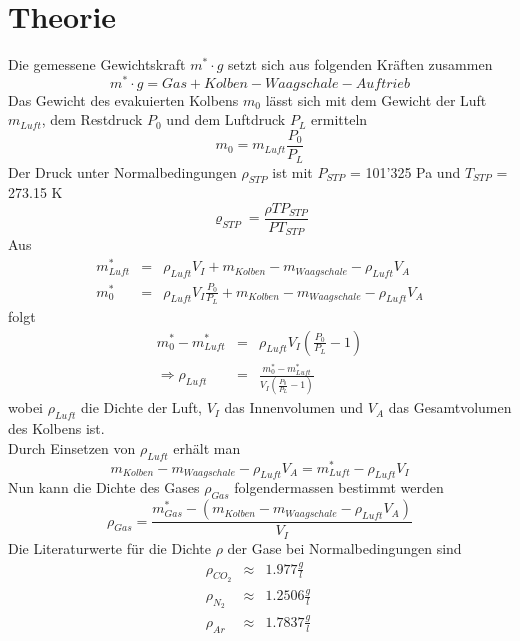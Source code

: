 \documentclass[12pt,a4paper]{article}
\begin{document}
\section*{Theorie}
Die gemessene Gewichtskraft $m^* \cdot g$ setzt sich aus folgenden Kr\"aften zusammen 
\begin{equation}
m^* \cdot g = Gas + Kolben - Waagschale - Auftrieb
\end{equation}
Das Gewicht des evakuierten Kolbens $m_0$ l\"asst sich mit dem Gewicht der Luft $m_{Luft}$, dem Restdruck $P_0$ und dem Luftdruck $P_L$ ermitteln
\begin{equation}
m_0 = m_{Luft} \frac{P_0}{P_L}
\end{equation}
Der Druck unter Normalbedingungen $\rho_{STP}$ ist mit $P_{STP}$ = 101'325 Pa und $T_{STP}$ = 273.15 K
\begin{equation}\label{eq:stp}
\varrho_{STP} = \frac{\rho T P_{STP}}{P T_{STP}}
\end{equation}
Aus
\begin{eqnarray}
m^*_{Luft} & = & \rho _{Luft} V_I + m_{Kolben} - m_{Waagschale} - \rho_{Luft} V_A \\
m^*_0 & = & \rho_{Luft} V_I \frac{P_0}{P_L} + m_{Kolben} - m_{Waagschale} - \rho_{Luft} V_A 
\end{eqnarray}
folgt
\begin{eqnarray}
m^*_0 - m^*_{Luft} & = & \rho_{Luft}V_I \left( \frac{P_0}{P_L}-1\right) \\
\Rightarrow \rho_{Luft} & = & \frac{m^*_0 - m^*_{Luft}}{V_I \left( \frac{P_0}{P_L}-1\right)}  \label{eq:rl}
\end{eqnarray}
wobei $\rho_{Luft}$ die Dichte der Luft, $V_I$ das Innenvolumen und $V_A$ das Gesamtvolumen des Kolbens ist. \\
Durch Einsetzen von $\rho_{Luft}$ erh\"alt man
\begin{equation}\label{eq:const}
m_{Kolben} - m_{Waagschale} - \rho_{Luft} V_A = m^*_{Luft} - \rho _{Luft} V_I
\end{equation}
Nun kann die Dichte des Gases $\rho_{Gas}$ folgendermassen bestimmt werden
\begin{equation}\label{eq:rg}
\rho _{Gas} = \frac{m^*_{Gas} - (m_{Kolben} - m_{Waagschale} - \rho_{Luft} V_A)}{V_I}
\end{equation}
Die Literaturwerte f\"ur die Dichte $\rho$ der Gase bei Normalbedingungen sind
\begin{eqnarray}
\rho_{CO_2} & \approx & 1.977 \frac{g}{l}\\
\rho_{N_2} & \approx & 1.2506  \frac{g}{l}\\
\rho_{Ar} & \approx & 1.7837  \frac{g}{l}\
\end{eqnarray}
\end{document}
